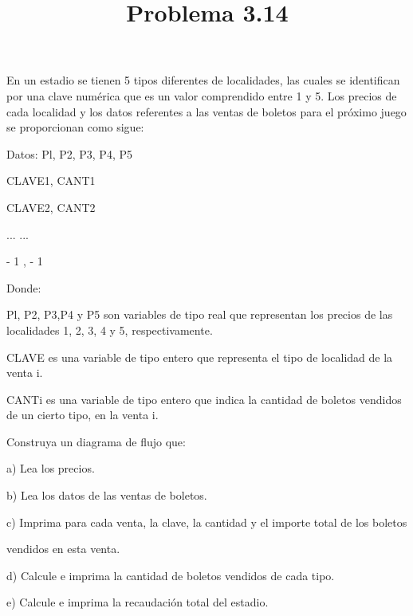 \documentclass[11pt]{amsart}
\title{Problema 3.14}
\begin{document}
\maketitle
\noindent En un estadio se tienen 5 tipos diferentes de localidades, las cuales se identifican
por una clave numérica que es un valor comprendido entre 1 y 5. Los precios de
cada localidad y los datos referentes a las ventas de boletos para el próximo juego se proporcionan como sigue:
\newline

\noindent Datos: Pl, P2, P3, P4, P5

\noindent CLAVE1, CANT1

\noindent CLAVE2, CANT2

\noindent ...    ...

\noindent - 1 , - 1
\newline

\noindent Donde:
\newline

\noindent Pl, P2, P3,P4 y P5 son variables de tipo real que representan los precios de las localidades 1, 2, 3, 4 y 5, respectivamente.
\newline

\noindent CLAVE es una variable de tipo entero que representa el tipo de localidad de la venta i.
\newline

\noindent CANTi es una variable de tipo entero que indica la cantidad de boletos vendidos de un cierto tipo, en la venta i.
\newline

\noindent Construya un diagrama de flujo que:

a) Lea los precios.

b) Lea los datos de las ventas de boletos.

c) Imprima para cada venta, la clave, la cantidad y el importe total de los boletos 

vendidos en esta venta.

d) Calcule e imprima la cantidad de boletos vendidos de cada tipo.

e) Calcule e imprima la recaudación total del estadio.
\newline
\end{document}
